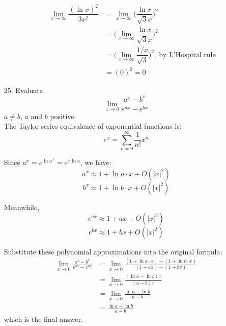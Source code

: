 \documentclass{article}
\begin{document}
\begin{enumerate}
\begin{enumerate}
            \begin{equation*}
            \begin{aligned}
                \lim_{x \rightarrow \infty} \dfrac{(\ln{x})^2}{3x^2}
                &= \lim_{x \rightarrow \infty} \bigg( \dfrac{\ln{x}}{\sqrt{3}x} \bigg)^2 \\
                &= \bigg( \lim_{x \rightarrow \infty} \dfrac{\ln{x}}{\sqrt{3}x} \bigg)^2 \\
                &= \bigg( \lim_{x \rightarrow \infty} \dfrac{1/x}{\sqrt{3}} \bigg)^2,\ \textrm{by L'Hospital rule} \\
                &= (0)^2 = 0
            \end{aligned}
            \end{equation*}
            
        \end{enumerate}
    
    \item[25.] Evaluate $$ \lim_{x \rightarrow 0} \frac{a^x-b^x}{e^{ax}-e^{bx}} $$ 
    $a \neq b$, $a$ and $b$ positive. \\
    
    The Taylor series equivalence of exponential functions is:
    $$ e^x = \sum_{n=0}^{\infty} \dfrac{1}{n!}x^n $$
    
    Since $a^x = e^{\ln{a^x}} = e^{x\ln{a}}$, we have:
    $$ a^x \approx 1 + \ln{a}\cdot x + O(|x|^2) $$
    $$ b^x \approx 1 + \ln{b}\cdot x + O(|x|^2) $$ 
    
    Meanwhile,
    $$ e^{ax} \approx 1 + ax + O(|x|^2) $$
    $$ e^{bx} \approx 1 + bx + O(|x|^2) $$
    
    Substitute these polynomial approximations into the original formula:
    \begin{equation*}
    \begin{aligned}
        \lim_{x \rightarrow 0} \frac{a^x-b^x}{e^{ax}-e^{bx}}
        &= \lim_{x \rightarrow 0} \frac{(1+\ln{a}\cdot x) - (1+\ln{b}\cdot x)}{(1+ax) - (1+bx)} \\
        &= \lim_{x \rightarrow 0} \frac{(\ln{a} - \ln{b})x}{(a - b)x} \\
        &= \lim_{x \rightarrow 0} \frac{\ln{a} - \ln{b}}{a - b} \\
        &= \frac{\ln{a} - \ln{b}}{a - b}
    \end{aligned}
    \end{equation*}
    which is the final answer.
    
\end{enumerate}
\end{document}
